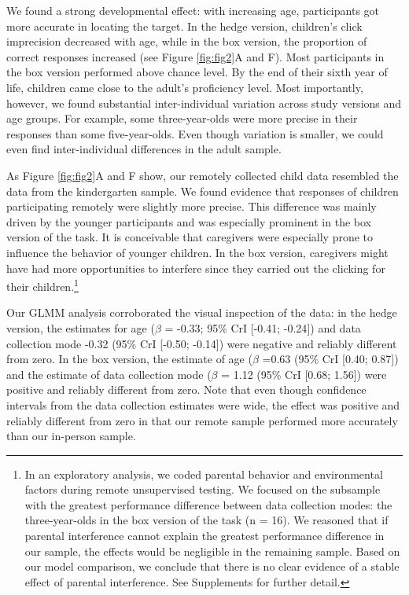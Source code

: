 \documentclass[
  man,floatsintext]{apa6}
\begin{document}
We found a strong developmental effect: with increasing age, participants got more accurate in locating the target.
In the hedge version, children's click imprecision decreased with age, while in the box version, the proportion of correct responses increased (see Figure \ref{fig:fig2}A and F).
Most participants in the box version performed above chance level.
By the end of their sixth year of life, children came close to the adult's proficiency level.
Most importantly, however, we found substantial inter-individual variation across study versions and age groups.
For example, some three-year-olds were more precise in their responses than some five-year-olds.
Even though variation is smaller, we could even find inter-individual differences in the adult sample.

As Figure \ref{fig:fig2}A and F show, our remotely collected child data resembled the data from the kindergarten sample.
We found evidence that responses of children participating remotely were slightly more precise.
This difference was mainly driven by the younger participants and was especially prominent in the box version of the task.
It is conceivable that caregivers were especially prone to influence the behavior of younger children.
In the box version, caregivers might have had more opportunities to interfere since they carried out the clicking for their children.\footnote{In an exploratory analysis, we coded parental behavior and environmental factors during remote unsupervised testing.
  We focused on the subsample with the greatest performance difference between data collection modes: the three-year-olds in the box version of the task (n = 16).
  We reasoned that if parental interference cannot explain the greatest performance difference in our sample, the effects would be negligible in the remaining sample.
  Based on our model comparison, we conclude that there is no clear evidence of a stable effect of parental interference.
  See Supplements for further detail.}

Our GLMM analysis corroborated the visual inspection of the data: in the hedge version, the estimates for age (\(\beta\) = -0.33; 95\% CrI {[}-0.41; -0.24{]}) and data collection mode -0.32 (95\% CrI {[}-0.50; -0.14{]}) were negative and reliably different from zero.
In the box version, the estimate of age (\(\beta\) =0.63 (95\% CrI {[}0.40; 0.87{]}) and the estimate of data collection mode (\(\beta\) = 1.12 (95\% CrI {[}0.68; 1.56{]}) were positive and reliably different from zero.
Note that even though confidence intervals from the data collection estimates were wide, the effect was positive and reliably different from zero in that our remote sample performed more accurately than our in-person sample.
\end{document}
